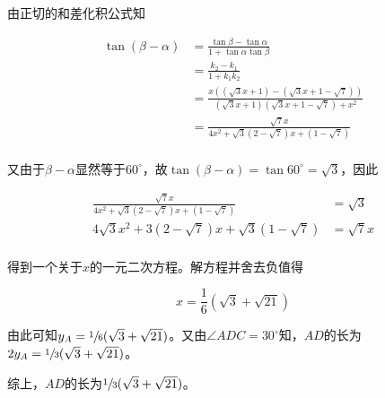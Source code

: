 由正切的和差化积公式知

\begin{align*}
  \tan(\beta - \alpha) &= \frac{\tan\beta - \tan\alpha}{1 + \tan\alpha\tan\beta} \\
  &= \frac{k_2 - k_1}{1 + k_1k_2} \\
  &= \frac{x\left((\sqrt3x + 1) - (\sqrt3x + 1 - \sqrt7)\right)}{\left(\sqrt3x + 1\right)\left(\sqrt3x + 1 - \sqrt7\right) + x^2} \\
  &= \frac{\sqrt7x}{4x^2 + \sqrt3(2 - \sqrt7)x + (1 - \sqrt7)} \\
\end{align*}

又由于$\beta - \alpha$显然等于$60^\circ$，故$\tan(\beta - \alpha) = \tan 60^\circ = \sqrt3$，因此

\begin{align*}
  \frac{\sqrt7x}{4x^2 + \sqrt3(2 - \sqrt7)x + (1 - \sqrt7)} &= \sqrt3 \\
  4\sqrt3x^2 + 3(2 - \sqrt7)x + \sqrt3(1 - \sqrt7) &= \sqrt7x \\
\end{align*}

得到一个关于$x$的一元二次方程。解方程并舍去负值得

\[ x = \frac16(\sqrt3 + \sqrt{21}) \]

由此可知$y_A = \sfrac16(\sqrt3 + \sqrt{21})$。又由$\angle ADC = 30^\circ$知，$AD$的长为$2y_A = \sfrac13(\sqrt3 + \sqrt{21})$。

综上，$AD$的长为$\sfrac13(\sqrt3 + \sqrt{21})$。

